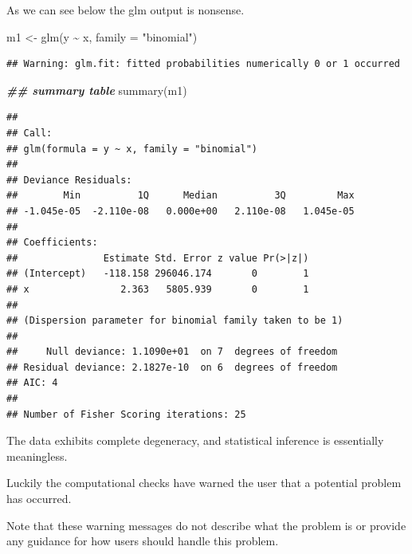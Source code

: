 \documentclass[
  ignorenonframetext,
]{beamer}
\newenvironment{Shaded}{\begin{snugshade}}{\end{snugshade}}
\newcommand{\AttributeTok}[1]{\textcolor[rgb]{0.77,0.63,0.00}{#1}}
\newcommand{\DocumentationTok}[1]{\textcolor[rgb]{0.56,0.35,0.01}{\textbf{\textit{#1}}}}
\newcommand{\FunctionTok}[1]{\textcolor[rgb]{0.00,0.00,0.00}{#1}}
\newcommand{\NormalTok}[1]{#1}
\newcommand{\OtherTok}[1]{\textcolor[rgb]{0.56,0.35,0.01}{#1}}
\newcommand{\SpecialCharTok}[1]{\textcolor[rgb]{0.00,0.00,0.00}{#1}}
\newcommand{\StringTok}[1]{\textcolor[rgb]{0.31,0.60,0.02}{#1}}
\begin{document}
\begin{frame}[fragile]{}
\protect\hypertarget{section-2}{}
As we can see below the glm output is nonsense.

\vspace{12pt}
\tiny

\begin{Shaded}
\begin{Highlighting}[]
\NormalTok{m1 }\OtherTok{\textless{}{-}} \FunctionTok{glm}\NormalTok{(y }\SpecialCharTok{\textasciitilde{}}\NormalTok{ x, }\AttributeTok{family =} \StringTok{"binomial"}\NormalTok{)}
\end{Highlighting}
\end{Shaded}

\begin{verbatim}
## Warning: glm.fit: fitted probabilities numerically 0 or 1 occurred
\end{verbatim}

\begin{Shaded}
\begin{Highlighting}[]
\DocumentationTok{\#\# summary table}
\FunctionTok{summary}\NormalTok{(m1)}
\end{Highlighting}
\end{Shaded}

\begin{verbatim}
## 
## Call:
## glm(formula = y ~ x, family = "binomial")
## 
## Deviance Residuals: 
##        Min          1Q      Median          3Q         Max  
## -1.045e-05  -2.110e-08   0.000e+00   2.110e-08   1.045e-05  
## 
## Coefficients:
##               Estimate Std. Error z value Pr(>|z|)
## (Intercept)   -118.158 296046.174       0        1
## x                2.363   5805.939       0        1
## 
## (Dispersion parameter for binomial family taken to be 1)
## 
##     Null deviance: 1.1090e+01  on 7  degrees of freedom
## Residual deviance: 2.1827e-10  on 6  degrees of freedom
## AIC: 4
## 
## Number of Fisher Scoring iterations: 25
\end{verbatim}
\end{frame}

\begin{frame}{}
\protect\hypertarget{section-3}{}
The data exhibits complete degeneracy, and statistical inference is
essentially meaningless.

\vspace{12pt}

Luckily the computational checks have warned the user that a potential
problem has occurred.

\vspace{12pt}

Note that these warning messages do not describe what the problem is or
provide any guidance for how users should handle this problem.
\end{frame}
\end{document}
